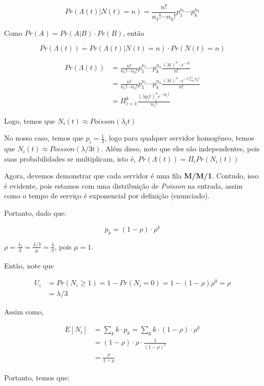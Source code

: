 \documentclass[conference]{IEEEtran}
\begin{document}
$$
Pr(\Lambda(t) | N(t) = n) = \frac{n!}{n_1!\cdots n_k!} p_1^{n_1} \cdots p_k^{n_k}
$$

Como $Pr(A) = Pr(A|B) \cdot Pr(B)$, então

$$
Pr(\Lambda(t)) = Pr(\Lambda(t) | N(t) = n) \cdot Pr(N(t) = n)
$$

\begin{align*}
Pr(\Lambda(t)) &= \frac{n!}{n_1!\cdots n_k!} p_1^{n_1} \cdots p_k^{n_k} \frac{(\lambda t)^n \cdot e^{-\lambda t}}{n!} \\ 
&= \frac{n!}{n_1!\cdots n_k!} p_1^{n_1} \cdots p_k^{n_k} \frac{(\lambda t)^n \cdot e^{-\lambda \sum_k p_k t}}{n!} \\ 
&= \Pi_{i=1}^k \frac{(\lambda p_i t)^n_i e^{- \lambda p_i t}}{n_i !}
\end{align*}

Logo, temos que $N_i (t) \approx Poisson(\lambda_i t)$

No nosso caso, temos que $p_i = \frac{1}{3}$, logo para qualquer servidor homogêneo, temos que $N_i(t) \approx Poisson(\lambda/3 t)$. Além disso, note que eles são independentes, pois suas probabilidades se multiplicam, isto é, $Pr(\Lambda(t)) = \Pi_i Pr(N_i(t))$

Agora, devemos demonstrar que cada servidor é uma fila \textbf{M/M/1}. Contudo, isso é evidente, pois estamos com uma distribuição de \textit{Poisson} na entrada, assim como o tempo de serviço é exponencial por definição (enunciado).

Portanto, dado que:

$$
p_k = (1 - \rho) \cdot \rho^k
$$

$\rho = \frac{\lambda_i}{3} = \frac{\lambda/3}{\mu} = \frac{\lambda}{3}$, pois $\mu = 1$.

Então, note que

\begin{align*}
U_i &= Pr(N_i \geq 1) = 1 - Pr(N_i = 0) = 1 - (1 - \rho) \rho^0 = \rho \\
&= \lambda/3
\end{align*}

Assim como,

\begin{align*}
E[N_i] &= \sum_k k \cdot p_k = \sum_k k \cdot (1 - \rho) \cdot \rho^{k} \\ 
&= (1 - \rho) \cdot \rho \cdot \frac{1}{(1-\rho)^2} \\ 
&= \frac{\rho}{1 - \rho}
\end{align*}

Portanto, temos que:
\end{document}
